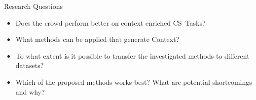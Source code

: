 \documentclass[final,hyperref={pdfpagelabels=true}]{beamer}
\begin{document}
\begin{frame}
\begin{columns}[t, onlytextwidth]
\begin{column}{\textwidth}
\begin{columns}[t, onlytextwidth]
			\begin{column}{.49\linewidth}
				\begin{block}{Research Questions}
					\begin{minipage}[t][.23\textheight][c]{\textwidth}
						\hfill
						\begin{minipage}[t]{0.93\textwidth}
					    	\begin{itemize}
								\justifying
								\small
								\setlength\itemsep{2.25cm}
					    		\item \textsc{}
								
								Does the crowd perform better on context enriched CS~Tasks?
					    		\item \textsc{}
								
								What methods can be applied that generate Context?
					    		\item \textsc{}
								
								To what extent is it possible to transfer the investigated methods to different datasets?
					    		\item \textsc{}
								
								Which of the proposed methods works best? What are potential shortcomings and why?
					    	\end{itemize}
						\end{minipage}
						\hfill
						\hbox{}
					\end{minipage}
				\end{block}
			\end{column}
			
		\end{columns}
		

\end{column}
\end{columns}
\end{frame}
\end{document}
